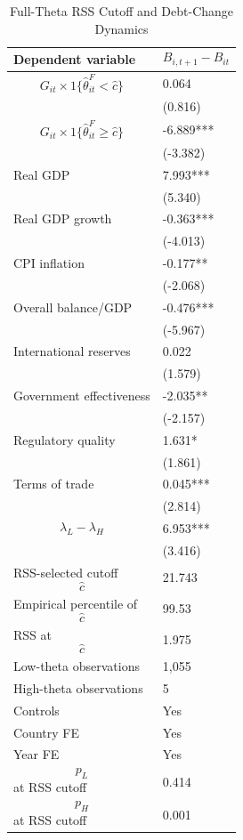 \begin{table}[H]\centering
\begin{threeparttable}
\caption{Full-Theta RSS Cutoff and Debt-Change Dynamics}
\label{tab:deltaB_rss_cutoff_fulltheta}
\scriptsize
\begin{tabularx}{\textwidth}{lY}
\toprule
Dependent variable & $$B_{i,t+1}-B_{it}$$ \\
\midrule
$$G_{it}\times 1\{\widehat{\theta}^{F}_{it}<\widehat{c}\}$$ & 0.064 \\
 & (0.816) \\
$$G_{it}\times 1\{\widehat{\theta}^{F}_{it}\geq\widehat{c}\}$$ & -6.889*** \\
 & (-3.382) \\
Real GDP & 7.993*** \\
 & (5.340) \\
Real GDP growth & -0.363*** \\
 & (-4.013) \\
CPI inflation & -0.177** \\
 & (-2.068) \\
Overall balance/GDP & -0.476*** \\
 & (-5.967) \\
International reserves & 0.022 \\
 & (1.579) \\
Government effectiveness & -2.035** \\
 & (-2.157) \\
Regulatory quality & 1.631* \\
 & (1.861) \\
Terms of trade & 0.045*** \\
 & (2.814) \\
$$\lambda_L-\lambda_H$$ & 6.953*** \\
 & (3.416) \\
\midrule
RSS-selected cutoff $$\widehat{c}$$ & 21.743 \\
Empirical percentile of $$\widehat{c}$$ & 99.53 \\
RSS at $$\widehat{c}$$ & 1.975 \\
Low-theta observations & 1,055 \\
High-theta observations & 5 \\
Controls & Yes \\
Country FE & Yes \\
Year FE & Yes \\
$$p_L$$ at RSS cutoff & 0.414 \\
$$p_H$$ at RSS cutoff & 0.001 \\

\end{tabularx}
\end{threeparttable}
\end{table}

